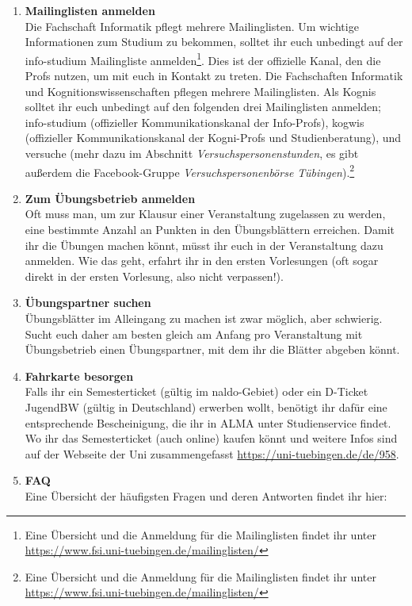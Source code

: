 \begin{enumerate}[label=$\bigcirc$]
  	\item \textbf{Mailinglisten anmelden}\\
  	\ifinfo
  		Die Fachschaft Informatik pflegt mehrere Mailinglisten. Um wichtige Informationen zum Studium zu bekommen, solltet ihr euch unbedingt auf der info-studium Mailingliste anmelden\footnote{Eine Übersicht und die Anmeldung für die Mailinglisten findet ihr unter \url{https://www.fsi.uni-tuebingen.de/mailinglisten/}}. Dies ist der offizielle Kanal, den die Profs nutzen, um mit euch in Kontakt zu treten.
  	\else
  		Die Fachschaften Informatik und Kognitionswissenschaften pflegen mehrere Mailinglisten. Als Kognis solltet ihr euch unbedingt auf den folgenden drei Mailinglisten anmelden; info-studium (offizieller Kommunikationskanal der Info-Profs), kogwis (offizieller Kommunikationskanal der Kogni-Profs und Studienberatung), und versuche (mehr dazu im Abschnitt \textit{Versuchspersonenstunden}, es gibt außerdem die Facebook-Gruppe \textit{Versuchspersonenbörse Tübingen}).\footnote{Eine Übersicht und die Anmeldung für die Mailinglisten findet ihr unter \url{https://www.fsi.uni-tuebingen.de/mailinglisten/}}
  	\fi
  	
	\item \textbf{Zum Übungsbetrieb anmelden} \\
	  	Oft muss man, um zur Klausur einer Veranstaltung zugelassen zu werden, eine bestimmte Anzahl an Punkten in den Übungsblättern erreichen. Damit ihr die Übungen machen könnt, müsst ihr euch in der Veranstaltung dazu anmelden. Wie das geht, erfahrt ihr in den ersten Vorlesungen (oft sogar direkt in der ersten Vorlesung, also nicht verpassen!).
	  	
  	\item \textbf{Übungspartner suchen} \\
	  	Übungsblätter im Alleingang zu machen ist zwar möglich, aber schwierig. Sucht euch daher am besten gleich am Anfang pro Veranstaltung mit Übungsbetrieb einen Übungspartner, mit dem ihr die Blätter abgeben könnt.
	  	
	\item \textbf{Fahrkarte besorgen} \\	
		Falls ihr ein Semesterticket (gültig im naldo-Gebiet) oder ein D-Ticket JugendBW (gültig in Deutschland) erwerben wollt, benötigt ihr dafür eine entsprechende Bescheinigung, die ihr in ALMA unter Studienservice findet. Wo ihr das Semesterticket (auch online) kaufen könnt und weitere Infos sind auf der Webseite der Uni zusammengefasst \url{https://uni-tuebingen.de/de/958}.
	
	\item \textbf{FAQ} \\
	\ifinfo
		Eine Übersicht der häufigsten Fragen und deren Antworten findet ihr hier:
	\else
	\fi
	
  \end{enumerate}

